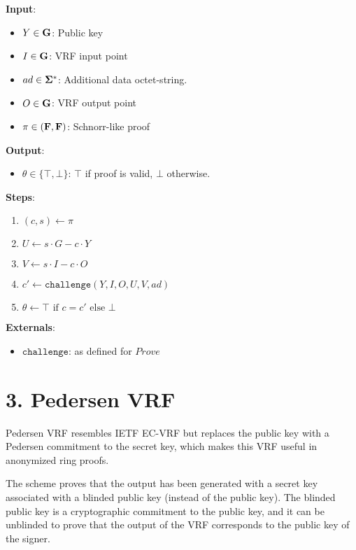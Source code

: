 \documentclass[
]{article}
\providecommand{\tightlist}{%
  \setlength{\itemsep}{0pt}\setlength{\parskip}{0pt}}
\begin{document}
\textbf{Input}:

\begin{itemize}
\tightlist
\item
  \(Y \in \bold{G}\): Public key
\item
  \(I \in \bold{G}\): VRF input point
\item
  \(ad \in \bold{\Sigma}^*\): Additional data octet-string.
\item
  \(O \in \bold{G}\): VRF output point
\item
  \(\pi \in (\bold{F}, \bold{F})\): Schnorr-like proof
\end{itemize}

\textbf{Output}:

\begin{itemize}
\tightlist
\item
  \(\theta \in \{ \top, \bot \}\): \(\top\) if proof is valid, \(\bot\)
  otherwise.
\end{itemize}

\textbf{Steps}:

\begin{enumerate}
\def\labelenumi{\arabic{enumi}.}
\tightlist
\item
  \((c, s) \gets \pi\)
\item
  \(U \gets s \cdot G - c \cdot Y\)
\item
  \(V \gets s \cdot I - c \cdot O\)
\item
  \(c' \gets \texttt{challenge}(Y, I, O, U, V, ad)\)
\item
  \(\theta \gets \top \text{ if } c = c' \text{ else } \bot\)
\end{enumerate}

\textbf{Externals}:

\begin{itemize}
\tightlist
\item
  \(\texttt{challenge}\): as defined for \(Prove\)
\end{itemize}

\section{3. Pedersen VRF}\label{pedersen-vrf}

Pedersen VRF resembles IETF EC-VRF but replaces the public key with a
Pedersen commitment to the secret key, which makes this VRF useful in
anonymized ring proofs.

The scheme proves that the output has been generated with a secret key
associated with a blinded public key (instead of the public key). The
blinded public key is a cryptographic commitment to the public key, and
it can be unblinded to prove that the output of the VRF corresponds to
the public key of the signer.
\end{document}
